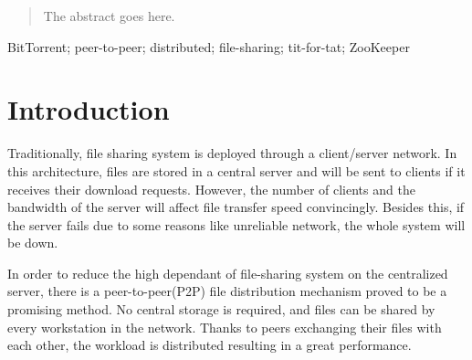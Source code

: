 \documentclass[conference]{IEEEtran}
\begin{document}
	
	
	
	
	
	
	
	\maketitle
	
	\begin{abstract}
		The abstract goes here.
	\end{abstract}
	
	\begin{IEEEkeywords} 
	BitTorrent; peer-to-peer; distributed; file-sharing; tit-for-tat; ZooKeeper
	\end{IEEEkeywords}

	
	
	
	
	\IEEEpeerreviewmaketitle
	
	
	
	\section{Introduction}
	Traditionally, file sharing system is deployed through a client/server network. In this architecture, files are stored in a central server and will be sent to clients if it receives their download requests. However, the number of clients and the bandwidth of the server will affect file transfer speed convincingly. Besides this, if the server fails due to some reasons like unreliable network, the whole system will be down. 
	
	In order to reduce the high dependant of file-sharing system on the centralized server, there is a peer-to-peer(P2P) file distribution mechanism proved to be a promising method. No central storage is required, and files can be shared by every workstation in the network. Thanks to peers exchanging their files with each other, the workload is distributed resulting in a great performance.
	
\end{document}
